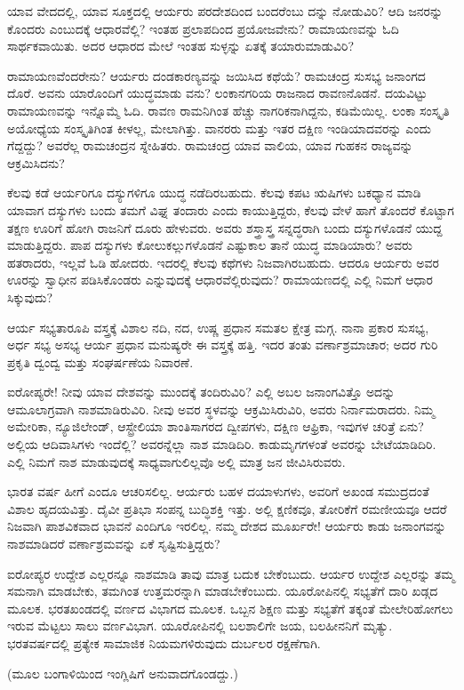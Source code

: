 ಯಾವ ವೇದದಲ್ಲಿ, ಯಾವ ಸೂಕ್ತದಲ್ಲಿ ಆರ್ಯರು ಪರದೇಶದಿಂದ ಬಂದರೆಂಬು ದನ್ನು ನೋಡುವಿರಿ? ಆದಿ ಜನರನ್ನು ಕೊಂದರು ಎಂಬುದಕ್ಕೆ ಆಧಾರವೆಲ್ಲಿ? ಇಂತಹ ಪ್ರಲಾಪದಿಂದ ಪ್ರಯೋಜವೇನು? ರಾಮಾಯಣವನ್ನು ಓದಿ ಸಾರ್ಥಕವಾಯಿತು. ಅದರ ಆಧಾರದ ಮೇಲೆ ಇಂತಹ ಸುಳ್ಳನ್ನು ಏತಕ್ಕೆ ತಯಾರುಮಾಡುವಿರಿ?

ರಾಮಾಯಣವೆಂದರೇನು? ಆರ್ಯರು ದಂಡಕಾರಣ್ಯವನ್ನು ಜಯಿಸಿದ ಕಥೆಯೆ? ರಾಮಚಂದ್ರ ಸುಸಭ್ಯ ಜನಾಂಗದ ದೊರೆ. ಅವನು ಯಾರೊಂದಿಗೆ ಯುದ್ಧಮಾಡು ವನು? ಲಂಕಾನಗರಿಯ ರಾಜನಾದ ರಾವಣನೊಡನೆ. ದಯವಿಟ್ಟು ರಾಮಾಯಣವನ್ನು ಇನ್ನೊಮ್ಮೆ ಓದಿ. ರಾವಣ ರಾಮನಿಗಿಂತ ಹೆಚ್ಚು ನಾಗರಿಕನಾಗಿದ್ದನು, ಕಡಿಮೆಯಿಲ್ಲ. ಲಂಕಾ ಸಂಸ್ಕೃತಿ ಅಯೋಧ್ಯೆಯ ಸಂಸ್ಕೃತಿಗಿಂತ ಕೀಳಲ್ಲ, ಮೇಲಾಗಿತ್ತು. ವಾನರರು ಮತ್ತು ಇತರ ದಕ್ಷಿಣ ಇಂಡಿಯಾದವರನ್ನು ಎಂದು ಗೆದ್ದದ್ದು? ಅವರೆಲ್ಲ ರಾಮಚಂದ್ರನ ಸ್ನೇಹಿತರು. ರಾಮಚಂದ್ರ ಯಾವ ವಾಲಿಯ, ಯಾವ ಗುಹಕನ ರಾಜ್ಯವನ್ನು ಆಕ್ರಮಿಸಿದನು?

ಕೆಲವು ಕಡೆ ಆರ್ಯರಿಗೂ ದಸ್ಯುಗಳಿಗೂ ಯುದ್ಧ ನಡೆದಿರಬಹುದು. ಕೆಲವು ಕಪಟ ಋಷಿಗಳು ಬಕಧ್ಯಾನ ಮಾಡಿ ಯಾವಾಗ ದಸ್ಯುಗಳು ಬಂದು ತಮಗೆ ವಿಘ್ನ ತಂದಾರು ಎಂದು ಕಾಯುತ್ತಿದ್ದರು, ಕೆಲವು ವೇಳೆ ಹಾಗೆ ತೊಂದರೆ ಕೊಟ್ಟಾಗ ತಕ್ಷಣ ಊರಿಗೆ ಹೋಗಿ ರಾಜನಿಗೆ ದೂರು ಹೇಳುವರು. ಅವರು ಶಸ್ತ್ರಾಸ್ತ್ರ ಸನ್ನದ್ಧರಾಗಿ ಬಂದು ದಸ್ಯುಗಳೊಡನೆ ಯುದ್ದ ಮಾಡುತ್ತಿದ್ದರು. ಪಾಪ ದಸ್ಯುಗಳು ಕೋಲುಕಲ್ಲುಗಳೊಡನೆ ಎಷ್ಟುಕಾಲ ತಾನೆ ಯುದ್ಧ ಮಾಡಿಯಾರು? ಅವರು ಹತರಾದರು, ಇಲ್ಲವೆ ಓಡಿ ಹೋದರು. ಇದರಲ್ಲಿ ಕೆಲವು ಕಥೆಗಳು ನಿಜವಾಗಿರಬಹುದು. ಆದರೂ ಆರ್ಯರು ಅವರ ಊರನ್ನು ಸ್ವಾಧೀನ ಪಡಿಸಿಕೊಂಡರು ಎನ್ನುವುದಕ್ಕೆ ಆಧಾರವೆಲ್ಲಿರುವುದು? ರಾಮಾಯಣದಲ್ಲಿ ಎಲ್ಲಿ ನಿಮಗೆ ಆಧಾರ ಸಿಕ್ಕುವುದು?

ಆರ್ಯ ಸಭ್ಯತಾರೂಪಿ ವಸ್ತ್ರಕ್ಕೆ ವಿಶಾಲ ನದಿ, ನದ, ಉಷ್ಣ ಪ್ರಧಾನ ಸಮತಲ ಕ್ಷೇತ್ರ ಮಗ್ಗ. ನಾನಾ ಪ್ರಕಾರ ಸುಸಭ್ಯ, ಅರ್ಧ ಸಭ್ಯ ಅಸಭ್ಯ ಆರ್ಯ ಪ್ರಧಾನ ಮನುಷ್ಯರೇ ಈ ವಸ್ತ್ರಕ್ಕೆ ಹತ್ತಿ. ಇದರ ತಂತು ವರ್ಣಾಶ್ರಮಾಚಾರ; ಅದರ ಗುರಿ ಪ್ರಕೃತಿ ದ್ವಂದ್ವ ಮತ್ತು ಸಂಘರ್ಷಣೆಯ ನಿವಾರಣೆ.

ಐರೋಪ್ಯರೇ! ನೀವು ಯಾವ ದೇಶವನ್ನು ಮುಂದಕ್ಕೆ ತಂದಿರುವಿರಿ? ಎಲ್ಲಿ ಅಬಲ ಜನಾಂಗವಿತ್ತೊ ಅದನ್ನು ಆಮೂಲಾಗ್ರವಾಗಿ ನಾಶಮಾಡಿರುವಿರಿ. ನೀವು ಅವರ ಸ್ಥಳವನ್ನು ಆಕ್ರಮಿಸಿರುವಿರಿ, ಅವರು ನಿರ್ನಾಮರಾದರು. ನಿಮ್ಮ ಅಮೇರಿಕಾ, ನ್ಯೂಜಿಲೇಂಡ್​, ಆಸ್ಟ್ರೇಲಿಯಾ ಶಾಂತಿಸಾಗರದ ದ್ವೀಪಗಳು, ದಕ್ಷಿಣ ಆಫ್ರಿಕಾ, ಇವುಗಳ ಚರಿತ್ರೆ ಏನು? ಅಲ್ಲಿಯ ಆದಿವಾಸಿಗಳು ಇಂದೆಲ್ಲಿ? ಅವರನ್ನೆಲ್ಲಾ ನಾಶ ಮಾಡಿದಿರಿ. ಕಾಡುಮೃಗಗಳಂತೆ ಅವರನ್ನು ಬೇಟೆಯಾಡಿದಿರಿ. ಎಲ್ಲಿ ನಿಮಗೆ ನಾಶ ಮಾಡುವುದಕ್ಕೆ ಸಾಧ್ಯವಾಗುಲಿಲ್ಲವೊ ಅಲ್ಲಿ ಮಾತ್ರ ಜನ ಜೀವಿಸಿರುವರು.

ಭಾರತ ವರ್ಷ ಹೀಗೆ ಎಂದೂ ಆಚರಿಸಲಿಲ್ಲ. ಆರ್ಯರು ಬಹಳ ದಯಾಳುಗಳು, ಅವರಿಗೆ ಅಖಂಡ ಸಮುದ್ರದಂತೆ ವಿಶಾಲ ಹೃದಯವಿತ್ತು. ದೈವೀ ಪ್ರತಿಭಾ ಸಂಪನ್ನ ಬುದ್ಧಿಶಕ್ತಿ ಇತ್ತು. ಅಲ್ಲಿ ಕ್ಷಣಿಕವೂ, ತೋರಿಕೆಗೆ ರಮಣೀಯವೂ ಆದರೆ ನಿಜವಾಗಿ ಪಾಶವಿಕವಾದ ಭಾವನೆ ಎಂದಿಗೂ ಇರಲಿಲ್ಲ. ನಮ್ಮ ದೇಶದ ಮೂರ್ಖರೇ! ಆರ್ಯರು ಕಾಡು ಜನಾಂಗವನ್ನು ನಾಶಮಾಡಿದರೆ ವರ್ಣಾಶ್ರಮವನ್ನು ಏಕೆ ಸೃಷ್ಟಿಸುತ್ತಿದ್ದರು?

ಐರೋಪ್ಯರ ಉದ್ದೇಶ ಎಲ್ಲರನ್ನೂ ನಾಶಮಾಡಿ ತಾವು ಮಾತ್ರ ಬದುಕ ಬೇಕೆಂಬುದು. ಆರ್ಯರ ಉದ್ದೇಶ ಎಲ್ಲರನ್ನು ತಮ್ಮ ಸಮನಾಗಿ ಮಾಡಬೇಕು, ತಮಗಿಂತ ಉತ್ತಮರನ್ನಾಗಿ ಮಾಡಬೇಕೆಂಬುದು. ಯೂರೋಪಿನಲ್ಲಿ ಸಭ್ಯತೆಗೆ ದಾರಿ ಖಡ್ಗದ ಮೂಲಕ. ಭರತಖಂಡದಲ್ಲಿ ವರ್ಣದ ವಿಭಾಗದ ಮೂಲಕ. ಒಬ್ಬನ ಶಿಕ್ಷಣ ಮತ್ತು ಸಭ್ಯತೆಗೆ ತಕ್ಕಂತೆ ಮೇಲೇರಿಹೋಗಲು ಇರುವ ಮೆಟ್ಟಲು ಸಾಲು ವರ್ಣವಿಭಾಗ. ಯೂರೋಪಿನಲ್ಲಿ ಬಲಶಾಲಿಗೇ ಜಯ, ಬಲಹೀನನಿಗೆ ಮೃತ್ಯು. ಭರತವರ್ಷದಲ್ಲಿ ಪ್ರತ್ಯೇಕ ಸಾಮಾಜಿಕ ನಿಯಮಗಳಿರುವುದು ದುರ್ಬಲರ ರಕ್ಷಣೆಗಾಗಿ.

\begin{center}
(ಮೂಲ ಬಂಗಾಳಿಯಿಂದ ಇಂಗ್ಲಿಷಿಗೆ ಅನುವಾದಗೊಂಡದ್ದು.)
\end{center}

